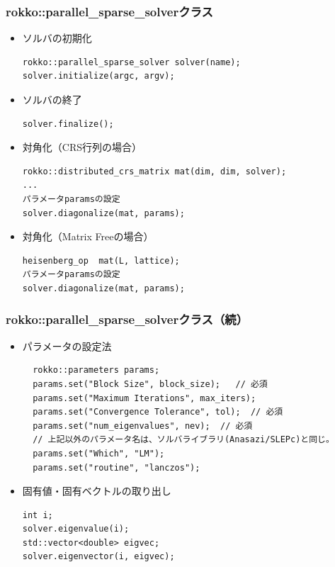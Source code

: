 \begin{frame}[c,fragile]
  \frametitle{rokko::parallel_sparse_solverクラス}
  \begin{itemize}
  \item ソルバの初期化
\begin{lstlisting}
rokko::parallel_sparse_solver solver(name);
solver.initialize(argc, argv);
\end{lstlisting}
  \item ソルバの終了
\begin{lstlisting}
solver.finalize();
\end{lstlisting}
  \item 対角化（CRS行列の場合）
\begin{lstlisting}
rokko::distributed_crs_matrix mat(dim, dim, solver);
...
パラメータparamsの設定
solver.diagonalize(mat, params);
\end{lstlisting}
  \item 対角化（Matrix Freeの場合）
\begin{lstlisting}
heisenberg_op  mat(L, lattice);
パラメータparamsの設定
solver.diagonalize(mat, params);
\end{lstlisting}
  \end{itemize}
\end{frame}

\begin{frame}[c,fragile]
  \frametitle{rokko::parallel_sparse_solverクラス（続）}
  \begin{itemize}
  \item パラメータの設定法
\begin{lstlisting}
  rokko::parameters params;
  params.set("Block Size", block_size);   // 必須
  params.set("Maximum Iterations", max_iters);
  params.set("Convergence Tolerance", tol);  // 必須
  params.set("num_eigenvalues", nev);  // 必須
  // 上記以外のパラメータ名は、ソルバライブラリ(Anasazi/SLEPc)と同じ。
  params.set("Which", "LM");
  params.set("routine", "lanczos");
\end{lstlisting}
  \item 固有値・固有ベクトルの取り出し
\begin{lstlisting}
int i;
solver.eigenvalue(i);
std::vector<double> eigvec;
solver.eigenvector(i, eigvec);
\end{lstlisting}
  \end{itemize}
\end{frame}


